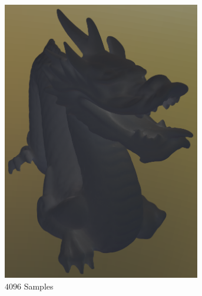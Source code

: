 \begin{figure}
\begin{subfigure}[b]{0.33\textwidth}
				\includegraphics[width=0.95\textwidth]{pic/irr_est-rc-dragon2-s4096-err.png}
				\caption{$4096$ Samples}
			\end{subfigure}
			\begin{subfigure}[b]{0.33\textwidth}
				\center

\end{subfigure}
\end{figure}
